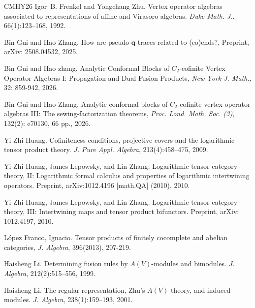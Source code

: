 \documentclass[12pt, english]{article}
\numberwithin{equation}{section}
\theoremstyle{plain}
\theoremstyle{definition}
\theoremstyle{remark}
\begin{document}
\begin{thebibliography}{CMHY26}
		Igor~B. Frenkel and Yongchang Zhu.
		\newblock Vertex operator algebras associated to representations of affine and {V}irasoro algebras.
		\newblock \emph{Duke Math. J.}, 66(1):123--168, 1992.
		
		Bin Gui and Hao Zhang.
		\newblock How are pseudo-$\mathbf{q}$-traces related to (co)ends?,
		\newblock Preprint, {arXiv}: 2508.04532, 2025.
		
		Bin Gui and Hao zhang.
		\newblock Analytic Conformal Blocks of $C_2$-cofinite Vertex Operator Algebras I: Propagation and Dual Fusion Products,
		\newblock \emph{New York J. Math.}, 32: 859-942, 2026.
		
		Bin Gui and Hao Zhang.
		\newblock Analytic conformal blocks of {$C_2$}-cofinite vertex operator algebras {III}: {T}he sewing-factorization theorems,
		\newblock \emph{Proc. Lond. Math. Soc. (3)}, 132(2): e70130, 66 pp., 2026.
		
		Yi-Zhi Huang.
		\newblock Cofiniteness conditions, projective covers and the logarithmic tensor product theory.
		\newblock \emph{J. Pure Appl. Algebra}, 213(4):458--475, 2009.
		
		Yi-Zhi Huang, James Lepowsky, and Lin Zhang.
		\newblock Logarithmic tensor category theory, {II}: {Logarithmic} formal calculus and properties of logarithmic intertwining operators.
		\newblock Preprint, {arXiv}:1012.4196 [math.{QA}] (2010), 2010.
		
		Yi-Zhi Huang, James Lepowsky, and Lin Zhang.
		\newblock Logarithmic tensor category theory, III: Intertwining maps and tensor product bifunctors.
		\newblock Preprint, {arXiv}: 1012.4197, 2010.
		
		L\'opez Franco, Ignacio.
		\newblock Tensor products of finitely cocomplete and abelian categories,
		\newblock \emph{J. Algebra}, 396(2013), 207-219.
		
		
		Haisheng Li.
		\newblock Determining fusion rules by {$A(V)$}-modules and bimodules.
		\newblock \emph{J. Algebra}, 212(2):515--556, 1999.
		
		Haisheng Li.
		\newblock The regular representation, {Zhu}'s {{$A(V)$}}-theory, and induced modules.
		\newblock \emph{J. Algebra}, 238(1):159--193, 2001.
		

\end{thebibliography}
\end{document}
